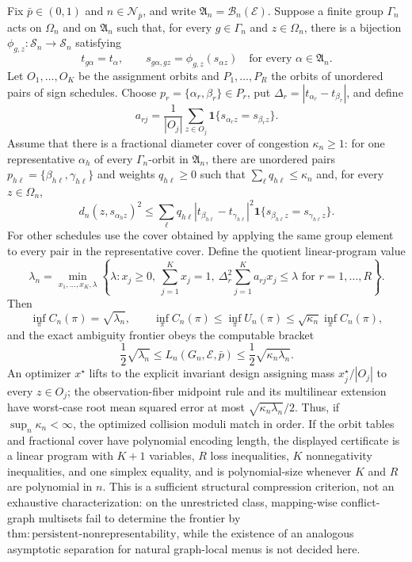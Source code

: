 Fix \(\bar p\in(0,1)\) and \(n\in\mathcal N_{\bar p}\), and write \(\mathfrak A_n=\mathcal B_n(\mathcal E)\). Suppose a finite group \(\Gamma_n\) acts on \(\Omega_n\) and on \(\mathfrak A_n\) such that, for every \(g\in\Gamma_n\) and \(z\in\Omega_n\), there is a bijection \(\phi_{g,z}:\mathcal S_n\to\mathcal S_n\) satisfying
\[
 t_{g\alpha}=t_\alpha,
 \qquad
 s_{g\alpha,gz}=\phi_{g,z}(s_{\alpha z})
 \quad\text{for every }\alpha\in\mathfrak A_n.
\]
Let \(O_1,\ldots,O_K\) be the assignment orbits and \(P_1,\ldots,P_R\) the orbits of unordered pairs of sign schedules. Choose \(p_r=\{\alpha_r,\beta_r\}\in P_r\), put \(\Delta_r=|t_{\alpha_r}-t_{\beta_r}|\), and define
\[
 a_{rj}=\frac{1}{|O_j|}\sum_{z\in O_j}
 \mathbf 1\{s_{\alpha_r z}=s_{\beta_r z}\}.
\]
Assume that there is a fractional diameter cover of congestion \(\kappa_n\ge1\): for one representative \(\alpha_h\) of every \(\Gamma_n\)-orbit in \(\mathfrak A_n\), there are unordered pairs \(p_{h\ell}=\{\beta_{h\ell},\gamma_{h\ell}\}\) and weights \(q_{h\ell}\ge0\) such that \(\sum_\ell q_{h\ell}\le\kappa_n\) and, for every \(z\in\Omega_n\),
\[
 d_n(z,s_{\alpha_h z})^2
 \le
 \sum_\ell q_{h\ell}
 |t_{\beta_{h\ell}}-t_{\gamma_{h\ell}}|^2
 \mathbf 1\{s_{\beta_{h\ell}z}=s_{\gamma_{h\ell}z}\}.
\]
For other schedules use the cover obtained by applying the same group element to every pair in the representative cover. Define the quotient linear-program value
\[
 \lambda_n=\min_{x_1,\ldots,x_K,\lambda}
 \left\{\lambda:
 x_j\ge0,\ \sum_{j=1}^Kx_j=1,\
 \Delta_r^2\sum_{j=1}^K a_{rj}x_j\le\lambda
 \text{ for }r=1,\ldots,R\right\}.
\]
Then
\[
 \inf_\pi C_n(\pi)=\sqrt{\lambda_n},
 \qquad
 \inf_\pi C_n(\pi)
 \le \inf_\pi U_n(\pi)
 \le \sqrt{\kappa_n}\inf_\pi C_n(\pi),
\]
and the exact ambiguity frontier obeys the computable bracket
\[
 \frac12\sqrt{\lambda_n}
 \le L_n(G_n,\mathcal E,\bar p)
 \le \frac12\sqrt{\kappa_n\lambda_n}.
\]
An optimizer \(x^\star\) lifts to the explicit invariant design assigning mass \(x_j^\star/|O_j|\) to every \(z\in O_j\); the observation-fiber midpoint rule and its multilinear extension have worst-case root mean squared error at most \(\sqrt{\kappa_n\lambda_n}/2\). Thus, if \(\sup_n\kappa_n<\infty\), the optimized collision moduli match in order. If the orbit tables and fractional cover have polynomial encoding length, the displayed certificate is a linear program with \(K+1\) variables, \(R\) loss inequalities, \(K\) nonnegativity inequalities, and one simplex equality, and is polynomial-size whenever \(K\) and \(R\) are polynomial in \(n\). This is a sufficient structural compression criterion, not an exhaustive characterization: on the unrestricted class, mapping-wise conflict-graph multisets fail to determine the frontier by \(\mathrm{thm{:}persistent\text{-}nonrepresentability}\), while the existence of an analogous asymptotic separation for natural graph-local menus is not decided here.